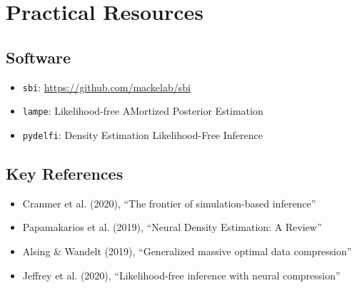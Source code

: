 \documentclass[11pt,a4paper]{article}
\theoremstyle{definition}
\begin{document}
\section{Practical Resources}

\subsection{Software}
\begin{itemize}
    \item \texttt{sbi}: \url{https://github.com/mackelab/sbi}
    \item \texttt{lampe}: Likelihood-free AMortized Posterior Estimation
    \item \texttt{pydelfi}: Density Estimation Likelihood-Free Inference
\end{itemize}

\subsection{Key References}
\begin{itemize}
    \item Cranmer et al. (2020), ``The frontier of simulation-based inference''
    \item Papamakarios et al. (2019), ``Neural Density Estimation: A Review''
    \item Alsing \& Wandelt (2019), ``Generalized massive optimal data compression''
    \item Jeffrey et al. (2020), ``Likelihood-free inference with neural compression''
\end{itemize}
\end{document}
